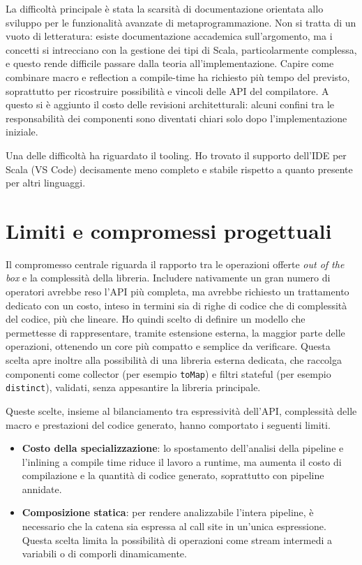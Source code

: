 \documentclass[a4paper,11pt]{report}
\theoremstyle{definition}
\begin{document}
La difficoltà principale è stata la scarsità di documentazione orientata allo sviluppo per le funzionalità avanzate di metaprogrammazione. Non si tratta di un vuoto di letteratura: esiste documentazione accademica sull'argomento, ma i concetti si intrecciano con la gestione dei tipi di Scala, particolarmente complessa, e questo rende difficile passare dalla teoria all'implementazione. Capire come combinare macro e reflection a compile-time ha richiesto più tempo del previsto, soprattutto per ricostruire possibilità e vincoli delle API del compilatore. A questo si è aggiunto il costo delle revisioni architetturali: alcuni confini tra le responsabilità dei componenti sono diventati chiari solo dopo l'implementazione iniziale.

Una delle difficoltà ha riguardato il tooling. Ho trovato il supporto dell'IDE per Scala (VS Code) decisamente meno completo e stabile rispetto a quanto presente per altri linguaggi.

\section{Limiti e compromessi progettuali}
\label{sec:limiti-compromessi}

Il compromesso centrale riguarda il rapporto tra le operazioni offerte \emph{out of the box} e la complessità della libreria. Includere nativamente un gran numero di operatori avrebbe reso l'API più completa, ma avrebbe richiesto un trattamento dedicato con un costo, inteso in termini sia di righe di codice che di complessità del codice, più che lineare. Ho quindi scelto di definire un modello che permettesse di rappresentare, tramite estensione esterna, la maggior parte delle operazioni, ottenendo un core più compatto e semplice da verificare. Questa scelta apre inoltre alla possibilità di una libreria esterna dedicata, che raccolga componenti come collector (per esempio \texttt{toMap}) e filtri stateful (per esempio \texttt{distinct}), validati, senza appesantire la libreria principale.

Queste scelte, insieme al bilanciamento tra espressività dell'API, complessità delle macro e prestazioni del codice generato, hanno comportato i seguenti limiti.
\begin{itemize}
  \item \textbf{Costo della specializzazione}: lo spostamento dell'analisi della pipeline e l'inlining a compile time riduce il lavoro a runtime, ma aumenta il costo di compilazione e la quantità di codice generato, soprattutto con pipeline annidate.
  \item \textbf{Composizione statica}: per rendere analizzabile l'intera pipeline, è necessario che la catena sia espressa al call site in un'unica espressione. Questa scelta limita la possibilità di operazioni come stream intermedi a variabili o di comporli dinamicamente.
\end{itemize}
\end{document}

